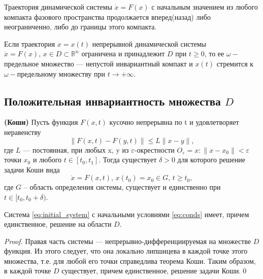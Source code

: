 \documentclass[14pt,a4paper]{extarticle}
\begin{document}
	\begin{theorem}\cite{Arnold}\label{th:Arnold}
		Траектория динамической системы $\dot{x}=F(x)$ с начальным значением из любого компакта фазового пространства продолжается вперед(назад) либо неограниченно, либо до границы этого компакта.
	\end{theorem}
	
	\begin{theorem}\cite{Khalil}\label{th:Khalil}
		Если траектория $x=x(t)$ непрерывной динамической системы $\dot{x}=F(x),\, x\in D\subset\mathbb{R}^n$ ограничена и принадлежит $D$ при $t \ge 0$, то ее $\omega-$предельное множество --- непустой инвариантный компакт и $x(t)$ стремится к $\omega-$предельному множеству при $t\rightarrow+\infty$.
	\end{theorem}
	
	\subsection{Положительная инвариантность множества $D$}
	
	\begin{theorem}\textbf{(Коши)}
		Пусть функция $F(x, t)$ кусочно непрерывна по t и удовлетворяет неравенству
		\[\|F(x,t)-F(y,t)\|\le L\|x-y\|,\]
		где $L$ — постоянная, при любых x, y из $\varepsilon$-окрестности $O_{\varepsilon} = {x : \|x - x_0\| < \varepsilon}$ точки $x_0$ и любого $t \in [t_0,t_1]$. Тогда существует $\delta > 0$ для которого решение задачи Коши вида 
		\[\dot{x}=F(x,t),\, x(t_0)=x_0\in G,\, t\ge t_0,\]
		где $G$ -- область определения системы, существует и единственно при \linebreak$ t\in[t_0,t_0+\delta)$. 
	\end{theorem}
	
	\begin{affirmation}
		 Система \ref{eq:initial_system} с начальными условиями \ref{eq:conds} имеет, причем единственное, решение на области $D$. 
	\end{affirmation}
	\begin{proof}
		Правая часть системы --- непрерывно-дифференциируемая на множестве $D$ функция. Из этого следует, что она локально липшицева в каждой точке этого множества, т.е. для любой его точки справедлива теорема Коши. Таким образом, в каждой точке $D$ существует, причем единственное, решение задачи Коши.\qed
	\end{proof}
	
\end{document}
